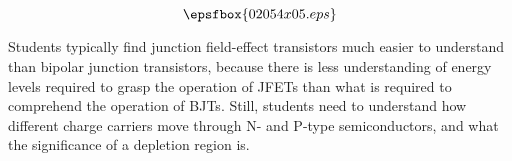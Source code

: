 $$\epsfbox{02054x05.eps}$$







Students typically find junction field-effect transistors much easier to understand than bipolar junction transistors, because there is less understanding of energy levels required to grasp the operation of JFETs than what is required to comprehend the operation of BJTs.  Still, students need to understand how different charge carriers move through N- and P-type semiconductors, and what the significance of a depletion region is.




